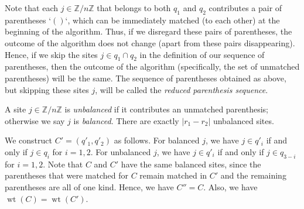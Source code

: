 \documentclass[reqno]{amsart}
\newcommand{\0}{\phantom{c}}
\DeclareMathOperator{\wt}{wt} %
\newcommand{\mcI}{\mathcal{I}}
\newcommand{\ZZ}{\mathbb{Z}}
\newcommand{\abs}[1]{\left| #1 \right|}
\newcommand{\defn}[1]{{\color{darkred}\emph{#1}}} %
\theoremstyle{plain}
\theoremstyle{definition}
\numberwithin{equation}{section}
\begin{document}
Note that each $j \in \ZZ/n\ZZ$ that belongs to both $q_1$ and $q_2$ contributes a pair of parentheses `$()$`, which can be immediately matched (to each other) at the beginning of the algorithm.
Thus, if we disregard these pairs of parentheses, the outcome of the algorithm does not change (apart from these pairs disappearing).
Hence, if we skip the sites $j \in q_1 \cap q_2$ in the definition of our sequence of parentheses, then the outcome of the algorithm (specifically, the set of unmatched parentheses) will be the same.
The sequence of parentheses obtained as above, but skipping these sites $j$, will be called the \defn{reduced parenthesis sequence}.

A site $j \in \ZZ/n\ZZ$ is \defn{unbalanced} if it contributes an unmatched parenthesis; otherwise we say $j$ is \defn{balanced}.
There are exactly $\abs{r_1 - r_2}$ unbalanced sites.

We construct $C' = (q'_1, q'_2)$ as follows.
For balanced $j$, we have $j \in q'_i$ if and only if $j \in q_i$ for $i=1,2$.
For unbalanced $j$, we have $j \in q'_i$ if and only if $j \in q_{3-i}$ for $i = 1,2$.
Note that $C$ and $C'$ have the same balanced sites, since the parentheses that were matched for $C$ remain matched in $C'$ and the remaining parentheses are all of one kind.
Hence, we have $C'' = C$. Also, we have $\wt(C) = \wt(C')$.
\end{document}

